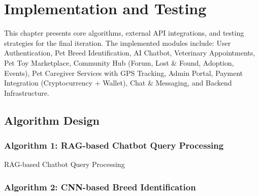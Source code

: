 \chapter{Implementation and Testing}
This chapter presents core algorithms, external API integrations, and testing strategies for the final iteration. The implemented modules include: User Authentication, Pet Breed Identification, AI Chatbot, Veterinary Appointments, Pet Toy Marketplace, Community Hub (Forum, Lost \& Found, Adoption, Events), Pet Caregiver Services with GPS Tracking, Admin Portal, Payment Integration (Cryptocurrency + Wallet), Chat \& Messaging, and Backend Infrastructure.

\section{Algorithm Design}

\subsection{Algorithm 1: RAG-based Chatbot Query Processing}

\begin{algorithmbox}{RAG-based Chatbot Query Processing}
\end{algorithmbox}

\subsection{Algorithm 2: CNN-based Breed Identification}

